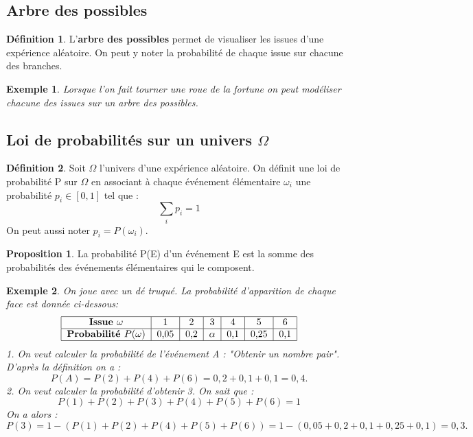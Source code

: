 \documentclass[a4paper,12pt]{article}
\newtheorem{Ex}{Exemple}[section]
\theoremstyle{theorem}
\theoremstyle{definition}
\theoremstyle{definition}
\newtheorem{Propos}{Proposition}[section]
\theoremstyle{definition}
\newtheorem{Def}{Définition}[section]
\begin{document}
	\subsection{Arbre des possibles}
		\begin{Def}
			L'\textbf{arbre des possibles} permet de visualiser les issues d'une expérience aléatoire. On peut y noter la probabilité de chaque issue sur chacune des branches.
		\end{Def}
	
		\begin{Ex}
			Lorsque l'on fait tourner une roue de la fortune on peut modéliser chacune des issues sur un arbre des possibles.
		\end{Ex}
	\subsection{Loi de probabilités sur un univers $\Omega$}
	
		\begin{Def}
			Soit $\Omega$ l'univers d'une expérience aléatoire. On définit une loi de probabilité P sur $\Omega$ en associant à chaque événement élémentaire $\omega_{i}$ une probabilité $p_{i} \in [0,1]$ tel que :
			\[\sum_{i}p_{i} = 1\]
			On peut aussi noter $p_{i} = P(\omega_{i})$.
		\end{Def}
		
		\begin{Propos}
			La probabilité P(E) d'un événement E est la somme des probabilités des événements élémentaires qui le composent.
		\end{Propos}
	
		\begin{Ex}
			On joue avec un dé truqué. La probabilité d'apparition de chaque face est donnée ci-dessous: \[
			\begin{tabular}{|c|c|c|c|c|c|c|}
				\hline \textbf{Issue $\omega$} & 1 & 2 & 3 & 4 & 5 & 6 \\
				\hline \textbf{Probabilité $P(\omega)$} & 0,05 & 0,2 & $\alpha$ & 0,1 & 0,25 & 0,1 \\
				\hline
			\end{tabular} \]
			1. On veut calculer la probabilité de l'événement A : "Obtenir un nombre pair". D'après la définition on a :
			\[P(A) = P(2)+P(4)+P(6) = 0,2+0,1+0,1 = 0,4.\]
			2. On veut calculer la probabilité d'obtenir 3. On sait que :
			\[P(1)+P(2)+P(3)+P(4)+P(5)+P(6) = 1\]
			On a alors : 
			\[P(3) = 1 - (P(1)+P(2)+P(4)+P(5)+P(6)) = 1-(0,05+0,2+0,1+0,25+0,1) = 0,3.\]
		\end{Ex}
	
\end{document}

